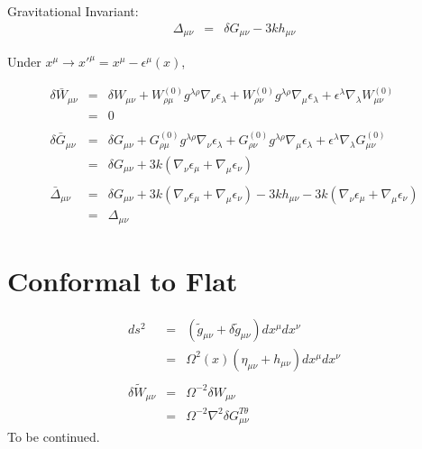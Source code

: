 \documentclass[10pt,letterpaper]{article}
\numberwithin{equation}{section}
\begin{document}
Gravitational Invariant:
\begin{eqnarray}
\Delta_{\mu\nu} &=& \delta G_{\mu\nu} - 3kh_{\mu\nu}
\end{eqnarray}

Under $x^\mu \to x'^{\mu} = x^\mu -\epsilon^\mu(x)$,

\begin{eqnarray}
\delta \bar W_{\mu\nu} &=& \delta W_{\mu\nu} + W^{(0)}_{\rho\mu}g^{\lambda\rho} \nabla_\nu \epsilon_\lambda + W^{(0)}_{\rho\nu}g^{\lambda\rho} \nabla_\mu \epsilon_\lambda + \epsilon^\lambda\nabla_\lambda W^{(0)}_{\mu\nu} 
\nonumber\\
&=&0
\nonumber\\\nonumber\\
\delta \bar G_{\mu\nu} &=& \delta G_{\mu\nu} + G^{(0)}_{\rho\mu}g^{\lambda\rho} \nabla_\nu \epsilon_\lambda + G^{(0)}_{\rho\nu}g^{\lambda\rho} \nabla_\mu \epsilon_\lambda + \epsilon^\lambda\nabla_\lambda G^{(0)}_{\mu\nu} 
\nonumber\\
&=&\delta G_{\mu\nu} + 3k(\nabla_\nu\epsilon_\mu + \nabla_\mu\epsilon_\nu)
\nonumber\\\nonumber\\
\bar\Delta _{\mu\nu} &=& \delta G_{\mu\nu} + 3k(\nabla_\nu\epsilon_\mu+\nabla_\mu\epsilon_\nu) -3kh_{\mu\nu} - 3k(\nabla_\nu\epsilon_\mu+\nabla_\mu\epsilon_\nu) 
\nonumber\\
&=& \Delta_{\mu\nu} 
\end{eqnarray}
%
%
\section{Conformal to Flat}
\begin{eqnarray}
ds^2 &=& (\tilde g_{\mu\nu} + \delta \tilde g_{\mu\nu})dx^\mu dx^\nu
\nonumber\\
&=&\Omega^2(x)(\eta_{\mu\nu} + h_{\mu\nu})dx^\mu dx^\nu
\nonumber\\ \nonumber\\
\delta \tilde W_{\mu\nu} &=& \Omega^{-2} \delta W_{\mu\nu}
\nonumber\\
&=& \Omega^{-2}\nabla^2 \delta G^{T\theta}_{\mu\nu}
\end{eqnarray}
To be continued.
\end{document}
